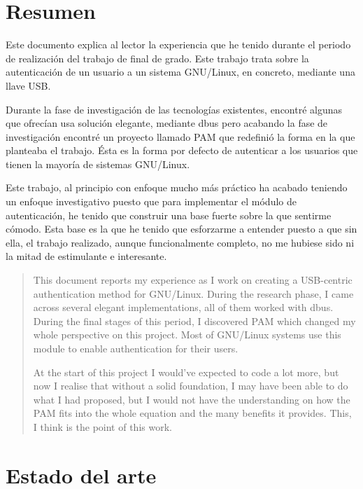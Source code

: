 \documentclass[titlepage, 12pt, a4paper]{article}
\begin{document}
\section{Resumen}
Este documento explica al lector la experiencia que he tenido durante el periodo de realización del trabajo de final de grado. Este trabajo trata sobre la autenticación de un usuario a un sistema \Gls{GNU/Linux}, en concreto, mediante una llave \Gls{USB}.\par Durante la fase de investigación de las tecnologías existentes, encontré algunas que ofrecían usa solución elegante, mediante \Gls{dbus} pero acabando la fase de investigación encontré un proyecto llamado \Gls{PAM} que redefinió la forma en la que planteaba el trabajo. Ésta es la forma por defecto de autenticar a los usuarios que tienen la mayoría de sistemas \Gls{GNU/Linux}.\par Este trabajo, al principio con enfoque mucho más práctico ha acabado teniendo un enfoque investigativo puesto que para implementar el módulo de autenticación, he tenido que construir una base fuerte sobre la que sentirme cómodo. Esta base es la que he tenido que esforzarme a entender puesto a que sin ella, el trabajo realizado, aunque funcionalmente completo, no me hubiese sido ni la mitad de estimulante e interesante.
\begin{abstract}
This document reports my experience as I work on creating a USB-centric authentication method for \Gls{GNU/Linux}. During the research phase, I came across several elegant implementations, all of them worked with \Gls{dbus}. During the final stages of this period, I discovered \Gls{PAM} which changed my whole perspective on this project. Most of \Gls{GNU/Linux} systems use this module to enable authentication for their users.\par At the start of this project I would've expected to code a lot more, but now I realise that without a solid foundation, I may have been able to do what I had proposed, but I would not have the understanding on how the \Gls{PAM} fits into the whole equation and the many benefits it provides. This, I think is the point of this work.
\end{abstract}
\clearpage
\listoffigures
\clearpage
\printglossary[title={Abreviaciones y tecnicismos}]
\clearpage
\section{Estado del arte}
\end{document}
